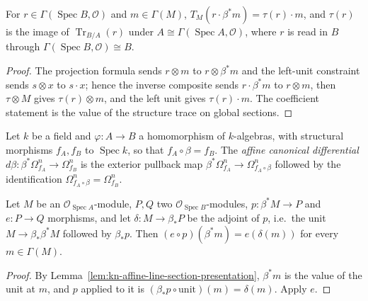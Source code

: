 \begin{lemma}
\label{lem:kn-affine-pulled-line-trace-value}
\leanok
For $r\in\Gamma(\operatorname{Spec}B,\mathcal O)$ and $m\in\Gamma(M)$,
$T_M(r\cdot\beta^*m)=\tau(r)\cdot m$, and $\tau(r)$ is the image of
$\operatorname{Tr}_{B/A}(r)$ under $A\cong\Gamma(\operatorname{Spec}A,\mathcal O)$, where
$r$ is read in $B$ through $\Gamma(\operatorname{Spec}B,\mathcal O)\cong B$.
\end{lemma}
\begin{proof}
The projection formula sends $r\otimes m$ to $r\otimes\beta^*m$ and the left-unit
constraint sends $s\otimes x$ to $s\cdot x$; hence the inverse composite sends
$r\cdot\beta^*m$ to $r\otimes m$, then $\tau\otimes M$ gives $\tau(r)\otimes m$, and the
left unit gives $\tau(r)\cdot m$. The coefficient statement is the value of the structure
trace on global sections.
\end{proof}

\begin{definition}
\label{def:kn-affine-algebra-canonical-differential}
\leanok
Let $k$ be a field and $\varphi:A\to B$ a homomorphism of $k$-algebras, with structural
morphisms $f_A,f_B$ to $\operatorname{Spec}k$, so that $f_A\circ\beta=f_B$. The
\emph{affine canonical differential}
$d\beta:\beta^*\Omega^n_{f_A}\to\Omega^n_{f_B}$ is the exterior pullback map
$\beta^*\Omega^n_{f_A}\to\Omega^n_{f_A\circ\beta}$ followed by the identification
$\Omega^n_{f_A\circ\beta}=\Omega^n_{f_B}$.
\end{definition}

\begin{lemma}
\label{lem:kn-affine-pullback-adjoint-unit-value}
\leanok
Let $M$ be an $\mathcal O_{\operatorname{Spec}A}$-module, $P,Q$ two
$\mathcal O_{\operatorname{Spec}B}$-modules, $p:\beta^*M\to P$ and $e:P\to Q$ morphisms, and
let $\delta:M\to\beta_*P$ be the adjoint of $p$, i.e.\ the unit $M\to\beta_*\beta^*M$
followed by $\beta_*p$. Then $(e\circ p)(\beta^*m)=e(\delta(m))$ for every
$m\in\Gamma(M)$.
\end{lemma}
\begin{proof}
By Lemma~\ref{lem:kn-affine-line-section-presentation}, $\beta^*m$ is the value of the unit at
$m$, and $p$ applied to it is $(\beta_*p\circ\mathrm{unit})(m)=\delta(m)$. Apply $e$.
\end{proof}

